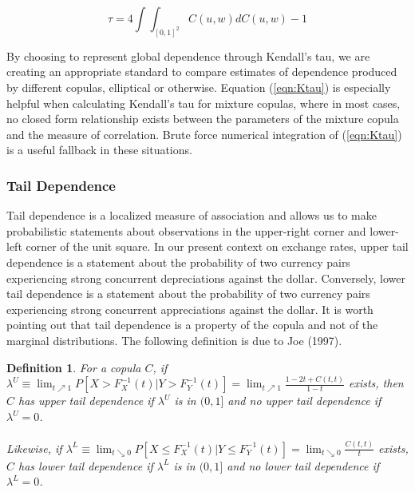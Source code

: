 \documentclass[12pt]{article}
\newtheorem{defn}{Definition}
\begin{document}
\begin{equation} \label{eqn:Ktau}
\tau = 4\int\int_{\left[0,1\right]^{2}}C\left(u,w\right)dC\left(u,w\right) - 1 
\end{equation}

By choosing to represent global dependence through Kendall's tau, we are creating an appropriate standard to compare estimates of dependence produced by different copulas, elliptical or otherwise. Equation (\ref{eqn:Ktau}) is especially helpful when calculating Kendall's tau for mixture copulas, where in most cases, no closed form relationship exists between the parameters of the mixture copula and the measure of correlation. Brute force numerical integration of (\ref{eqn:Ktau}) is a useful fallback in these situations.

\subsubsection{Tail Dependence}

Tail dependence is a localized measure of association and allows us to make probabilistic statements about observations in the upper-right corner and lower-left corner of the unit square. In our present context on exchange rates, upper tail dependence is a statement about the probability of two currency pairs experiencing strong concurrent depreciations against the dollar. Conversely, lower tail dependence is a statement about the probability of two currency pairs experiencing strong concurrent appreciations against the dollar. It is worth pointing out that tail dependence is a property of the copula and not of the marginal distributions. The following definition is due to Joe (1997).

\begin{defn} \label{defn:tail_dep}
For a copula $C$, if $\lambda^{U}\equiv\lim_{t\nearrow 1}P\left[X > F_{X}^{-1}\left(t\right) | Y > F_{Y}^{-1}\left(t\right)\right] = \lim_{t\nearrow 1}\frac{1-2t+C\left(t,t\right)}{1-t}$ exists, then $C$ has upper tail dependence if $\lambda^{U}$ is in $(0,1]$ and no upper tail dependence if $\lambda^{U}=0$. \\ \\ Likewise, if $\lambda ^{L}\equiv \lim_{t\searrow 0}P\left[X\leq F_{X}^{-1}\left(t\right) | Y\leq F_{Y}^{-1}\left(t\right)\right] =\lim_{t\searrow 0}\frac{C\left(t,t\right)}{t}$ exists, $C$ has lower tail dependence if $\lambda ^{L}$ is in $(0,1]$ and no lower tail dependence if $\lambda^{L} = 0$.
\end{defn}
\end{document}
